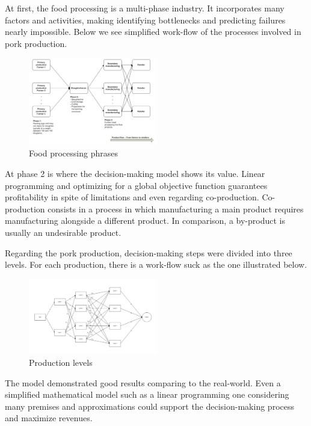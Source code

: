 \documentclass[a4paper,12pt]{article}
\begin{document}
    At first, the food processing is a multi-phase industry. It  incorporates many factors and activities, making identifying bottlenecks and predicting failures nearly impossible. Below we see simplified work-flow of the processes involved in pork production.
    
\begin{figure}[H]
\centering
\includegraphics[width=0.5\textwidth]{1.png}
\caption{Food processing phrases}
\end{figure}

    At phase 2 is where the decision-making model shows its value. Linear programming and optimizing for a global objective function guarantees profitability in spite of limitations and even regarding co-production. Co-production consists in a process in which manufacturing a main product requires manufacturing alongside a different product. In comparison, a by-product is usually an undesirable product.
    
    Regarding the pork production, decision-making steps were divided into three levels. For each production, there is a work-flow suck as the one illustrated below.
    
\begin{figure}[H]
\centering
\includegraphics[width=0.5\textwidth]{2.png}
\caption{Production levels}
\end{figure}
    
     The model demonstrated good results comparing to the real-world. Even a simplified mathematical model such as a linear programming one considering many premises and approximations could support the decision-making process and maximize revenues.
    
\end{document}
